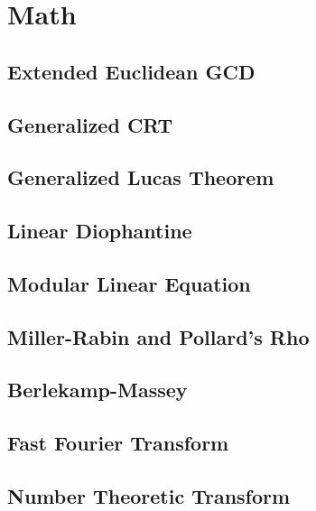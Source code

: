 \section{Math}
\subsection{Extended Euclidean GCD}

\subsection{Generalized CRT}

\subsection{Generalized Lucas Theorem}

\subsection{Linear Diophantine}

\subsection{Modular Linear Equation}

\subsection{Miller-Rabin and Pollard's Rho}

\subsection{Berlekamp-Massey}

\subsection{Fast Fourier Transform}

\subsection{Number Theoretic Transform}

